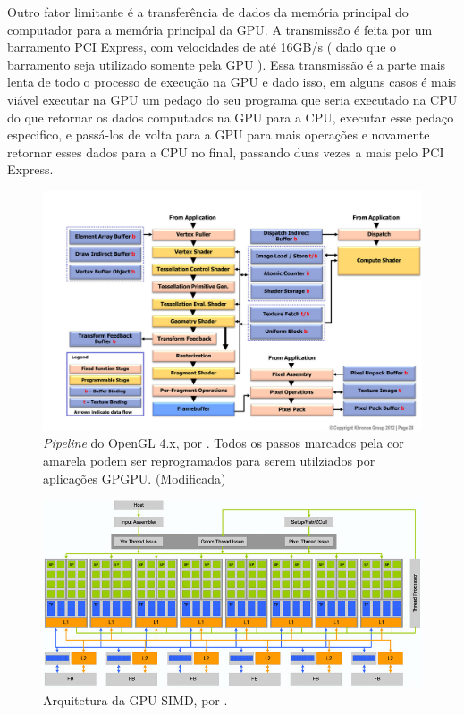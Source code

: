     Outro fator limitante é a transferência de dados da memória principal do computador para a memória
principal da GPU. A transmissão é feita por um barramento PCI Express, com velocidades de até 16GB/s ( dado que o
barramento seja utilizado somente pela GPU ). Essa transmissão é a parte mais lenta de todo o
processo de execução na GPU e dado isso, em alguns casos é mais viável executar na GPU um pedaço do seu programa que
seria executado na CPU do que retornar os dados computados na GPU para a CPU, executar esse pedaço especifico, e
passá-los de volta para a GPU para mais operações e novamente retornar esses dados para a CPU no final, passando duas
vezes a mais pelo PCI Express.

\begin{figure}[H]
    \centering
    \includegraphics[width=1\textwidth]{figuras/pipeline.jpg}
    \caption{\textit{Pipeline} do OpenGL 4.x, por \citep{pipeline}. Todos os passos marcados pela cor amarela podem
    ser reprogramados para serem utilziados por aplicações GPGPU. (Modificada)}
    \label{fig:pipeline}
\end{figure}

\begin{figure}[H]
    \centering
    \includegraphics[width=1\textwidth]{figuras/simd.jpg}
    \caption{Arquitetura da GPU SIMD, por \citep{blythe2008rise}.}
    \label{fig:simd}
\end{figure}

